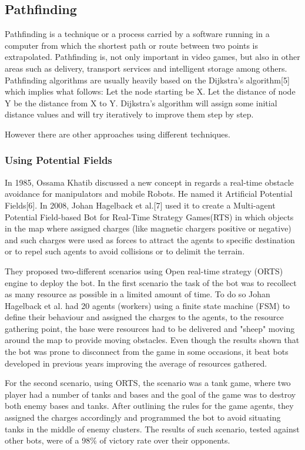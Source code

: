 \subsection{Pathfinding}


Pathfinding is a technique or a process carried by a software running in a computer from which the shortest path or route between two points is extrapolated. Pathfinding is, not only important in video games, but also in other areas such as delivery, transport services and intelligent storage among others. Pathfinding algorithms are usually heavily based on the Dijkstra's algorithm[5] which implies what follows: Let the node starting be X. Let the distance of node Y be the distance from X to Y. Dijkstra's algorithm will assign some initial distance values and will try iteratively to improve them step by step.

\vspace{2mm}
However there are other approaches using different techniques.



\subsubsection{Using Potential Fields}
In 1985, Ossama Khatib discussed a new concept in regards a real-time obstacle avoidance for manipulators and mobile Robots. He named it Artificial Potential Fields[6]. In 2008, Johan Hagelback et al.[7] used it to create a Multi-agent Potential Field-based Bot for Real-Time Strategy Games(RTS) in which objects in the map where assigned charges (like magnetic chargers positive or negative) and such charges were used as forces to attract the agents to specific destination or to repel such agents to avoid collisions or to delimit the terrain.

\vspace{2mm}
They proposed two-different scenarios using Open real-time strategy (ORTS) engine to deploy the bot. In the first scenario the task of the bot was to recollect as many resource as possible in a limited amount of time. To do so Johan Hagelback et al. had 20 agents (workers) using a finite state machine (FSM) to define their behaviour and assigned the charges to the agents, to the resource gathering point, the base were resources had to be delivered and "sheep" moving around the map to provide moving obstacles. Even though the results shown that the bot was prone to disconnect from the game in some occasions, it beat bots developed in previous years improving the average of resources gathered.

\vspace{2mm}
For the second scenario, using ORTS, the scenario was a tank game, where two player had a number of tanks and bases and the goal of the game was to destroy both enemy bases and tanks. After outlining the rules for the game agents, they assigned the charges accordingly and programmed the bot to avoid situating tanks in the middle of enemy clusters. The results of such scenario, tested against other bots, were of a 98\% of victory rate over their opponents.